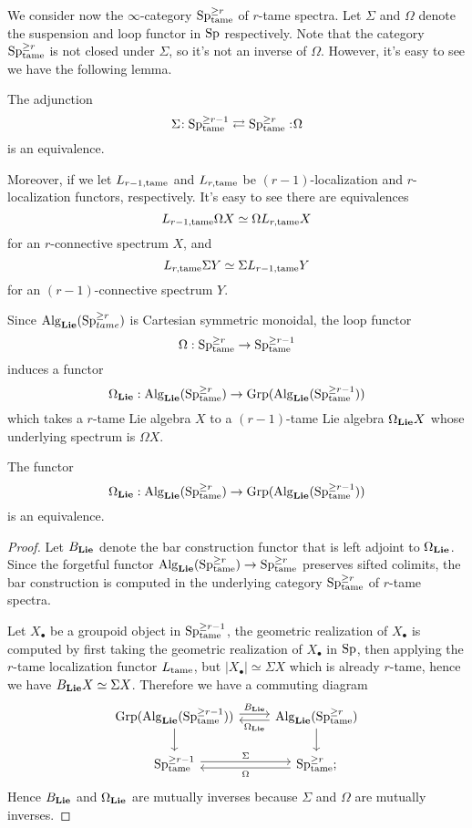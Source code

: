 We consider now the $\infty$-category $\operatorname{Sp}^{\geq r}_{\operatorname{\operatorname{tame}}}$ of $r$-tame spectra.
Let $\Sigma$ and $\Omega$ denote the suspension and loop functor in $\operatorname{Sp}$ respectively.
Note that the category $\operatorname{Sp}^{\geq r}_{\operatorname{\operatorname{tame}}}$ is not closed under $\Sigma$, so it's not an inverse of $\Omega$.
However, it's easy to see we have the following lemma.
\begin{lemma}
\label{Relations between different tameness}
	The adjunction
	\[
	\Sigma\negmedspace: \operatorname{Sp}^{\geq r-1}_{\operatorname{\operatorname{tame}}}\rightleftarrows \operatorname{Sp}^{\geq r}_{\operatorname{\operatorname{tame}}}:\negmedspace \Omega
	\]
	is an equivalence.
\end{lemma} 
Moreover, if we let $L_{r-1, \operatorname{\operatorname{tame}}}$ and $L_{r, \operatorname{\operatorname{tame}}}$ be $(r-1)$-localization and $r$-localization functors, respectively.
It's easy to see there are equivalences
$$
L_{r-1, \operatorname{\operatorname{tame}}} \Omega X \simeq \Omega L_{r, \operatorname{\operatorname{tame}}}X
$$
for an $r$-connective spectrum $X$, and 
$$
L_{r, \operatorname{\operatorname{tame}}} \Sigma Y \simeq \Sigma L_{r-1, \operatorname{\operatorname{tame}}} Y
$$
for an $(r-1)$-connective spectrum $Y$.


Since $\operatorname{Alg}_{\mathbf{Lie}}(\operatorname{Sp}^{\geq r}_{tame})$ is Cartesian symmetric monoidal, the loop functor 
$$
\Omega: \operatorname{Sp}^{\geq r}_{\operatorname{\operatorname{tame}}}
\to 
\operatorname{Sp}^{\geq r-1}_{\operatorname{\operatorname{tame}}}
$$
induces a functor
\[
\Omega_{\mathbf{Lie}}:\operatorname{Alg}_{\mathbf{Lie}}(\operatorname{Sp}^{\geq r}_{\operatorname{\operatorname{tame}}}) \to \operatorname{Grp}( \operatorname{Alg}_{\mathbf{Lie}}(\operatorname{Sp}^{\geq r-1}_{\operatorname{\operatorname{tame}}}) )
\]
which takes a $r$-tame Lie algebra $X$ to a $(r-1)$-tame Lie algebra $\Omega_{\mathbf{Lie}}X$ whose underlying spectrum is $\Omega X$.
\begin{proposition}
	\label{B and Omega are mutally inverses}
	The functor 
	\[
	\Omega_{\mathbf{Lie}}: 
	\operatorname{Alg}_{\mathbf{Lie}}(\operatorname{Sp}^{\geq r}_{\operatorname{\operatorname{tame}}}) \to \operatorname{Grp}( \operatorname{Alg}_{\mathbf{Lie}}(\operatorname{Sp}^{\geq r-1}_{\operatorname{\operatorname{tame}}}))
	\]
	is an equivalence.
\end{proposition}
\begin{proof}
	Let $B_{\mathbf{Lie}}$ denote the bar construction functor that is left adjoint to $\Omega_{\mathbf{Lie}}$. Since the forgetful functor 	
	$\operatorname{Alg}_{\mathbf{Lie}}(\operatorname{Sp}^{\geq r}_{\operatorname{\operatorname{tame}}}) \to \operatorname{Sp}^{\geq r}_{\operatorname{\operatorname{tame}}}$ preserves sifted colimits, the bar construction is computed in the underlying category $\operatorname{Sp}^{\geq r}_{\operatorname{\operatorname{tame}}}$ of $r$-tame spectra.
	
	Let $X_{\bullet}$ be a groupoid object in $\operatorname{Sp}^{\geq r-1}_{\operatorname{\operatorname{tame}}}$, the geometric realization of $X_{\bullet}$ is computed by first taking the geometric realization of $X_{\bullet}$ in $\operatorname{Sp}$, then applying the $r$-tame localization functor $L_{\operatorname{\operatorname{tame}}}$, but $|X_{\bullet}|\simeq \Sigma X$ which is already $r$-tame, hence we have $B_{\mathbf{Lie}}X\simeq \Sigma X$.
	Therefore we have a commuting diagram
	\[
	\begin{tikzcd}
		\Grp( \Alg_{\spLie}(\Sp^{\geq r-1}_{\tame}) ) & \Alg_{\spLie}(\Sp^{\geq r}_{\tame})\\
		\Sp^{\geq r-1}_{\tame} &
		\Sp^{\geq r}_{\tame};
		\arrow[from=1-1, to=1-2, "B_{\spLie}", shift left]
		\arrow[from=1-2, to=1-1, "\Omega_{\spLie}", shift left]
		\arrow[from=1-1, to=2-1]
		\arrow[from=1-2, to=2-2]
		\arrow[from=2-1, to=2-2, "\Sigma", shift left]
		\arrow[from=2-2, to=2-1, "\Omega", shift left]
	\end{tikzcd}
	\]
	Hence $B_{\mathbf{Lie}}$ and $\Omega_{\mathbf{Lie}}$ are mutually inverses because $\Sigma$ and $\Omega$ are mutually inverses.
\end{proof}

